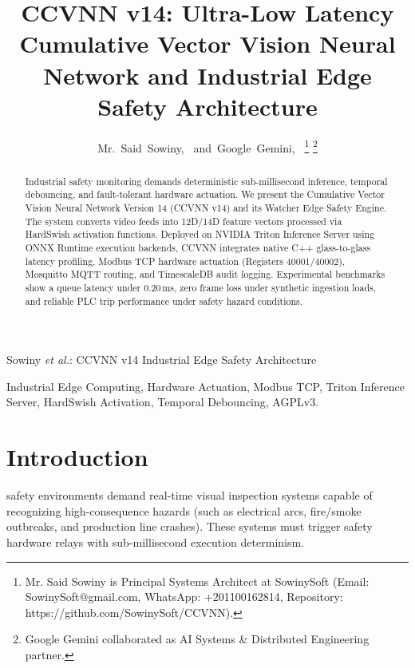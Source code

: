 \documentclass[10pt,journal,compsoc]{IEEEtran}
\begin{document}
\title{CCVNN v14: Ultra-Low Latency Cumulative Vector Vision Neural Network and Industrial Edge Safety Architecture}

\author{Mr.~Said~Sowiny,~
        and~Google~Gemini,~%
\thanks{Mr. Said Sowiny is Principal Systems Architect at SowinySoft (Email: SowinySoft@gmail.com, WhatsApp: +201100162814, Repository: https://github.com/SowinySoft/CCVNN).}%
\thanks{Google Gemini collaborated as AI Systems & Distributed Engineering partner.}}

%
{Sowiny \MakeLowercase{\textit{et al.}}: CCVNN v14 Industrial Edge Safety Architecture}

\maketitle

\begin{abstract}
Industrial safety monitoring demands deterministic sub-millisecond inference, temporal debouncing, and fault-tolerant hardware actuation. We present the Cumulative Vector Vision Neural Network Version 14 (CCVNN v14) and its Watcher Edge Safety Engine. The system converts video feeds into 12D/14D feature vectors processed via HardSwish activation functions. Deployed on NVIDIA Triton Inference Server using ONNX Runtime execution backends, CCVNN integrates native C++ glass-to-glass latency profiling, Modbus TCP hardware actuation (Registers 40001/40002), Mosquitto MQTT routing, and TimescaleDB audit logging. Experimental benchmarks show a queue latency under 0.20\,ms, zero frame loss under synthetic ingestion loads, and reliable PLC trip performance under safety hazard conditions.
\end{abstract}

\begin{IEEEkeywords}
Industrial Edge Computing, Hardware Actuation, Modbus TCP, Triton Inference Server, HardSwish Activation, Temporal Debouncing, AGPLv3.
\end{IEEEkeywords}

\section{Introduction}
 safety environments demand real-time visual inspection systems capable of recognizing high-consequence hazards (such as electrical arcs, fire/smoke outbreaks, and production line crashes). These systems must trigger safety hardware relays with sub-millisecond execution determinism.
\end{document}
